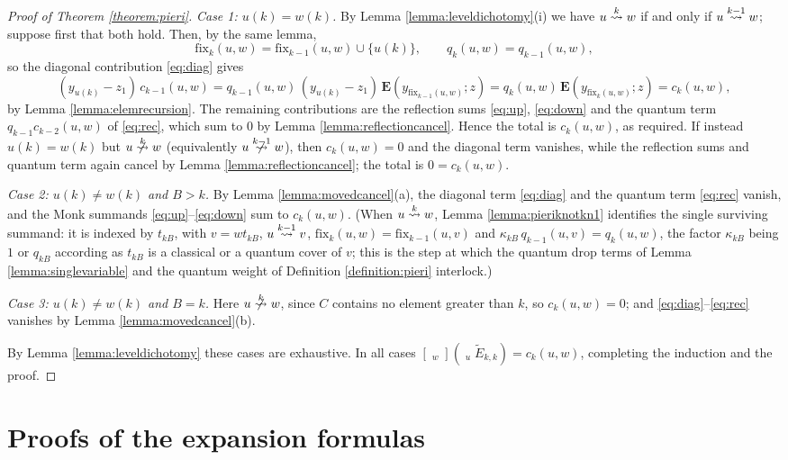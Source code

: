 \documentclass{amsart}
\theoremstyle{definition}
\theoremstyle{remark}
\numberwithin{equation}{section}
\DeclareMathOperator{\qsch}{\widetilde{\mathfrak{S}}}
\newcommand{\xrightsquigarrow}[2][]{%
	\mathrel{\mathop{\rightsquigarrow}\limits^{\scriptstyle #2}%
	\ifx\hfuzz#1\hfuzz\else_{\scriptstyle #1}\fi}%
}
\newcommand{\tom}[1]{\ensuremath{\xrightsquigarrow{#1}}}
\newcommand{\fx}{\mathrm{fix}}
\newcommand{\wte}{\mathbf{E}}
\newcommand{\qelem}{\widetilde{E}}
\begin{document}
\begin{proof}[Proof of Theorem \ref{theorem:pieri}]
\emph{Case 1: $u(k)=w(k)$.} By Lemma \ref{lemma:leveldichotomy}(i) we have $u\tom{k}w$ if and only if $u\tom{k-1}w$; suppose first that both hold. Then, by the same lemma,
$$\fx_{k}(u,w)=\fx_{{k-1}}(u,w)\cup\{u(k)\},\qquad q_k(u,w)=q_{k-1}(u,w),$$
so the diagonal contribution \eqref{eq:diag} gives
$$(y_{u(k)}-z_1)\,c_{k-1}(u,w)=q_{k-1}(u,w)\,(y_{u(k)}-z_1)\,\wte(y_{\fx_{{k-1}}(u,w)};z)=q_k(u,w)\,\wte(y_{\fx_{k}(u,w)};z)=c_k(u,w),$$
by Lemma \ref{lemma:elemrecursion}. The remaining contributions are the reflection sums \eqref{eq:up}, \eqref{eq:down} and the quantum term $q_{k-1}c_{k-2}(u,w)$ of \eqref{eq:rec}, which sum to $0$ by Lemma \ref{lemma:reflectioncancel}. Hence the total is $c_k(u,w)$, as required. If instead $u(k)=w(k)$ but $u\ntom{k}w$ (equivalently $u\ntom{k-1}w$), then $c_k(u,w)=0$ and the diagonal term vanishes, while the reflection sums and quantum term again cancel by Lemma \ref{lemma:reflectioncancel}; the total is $0=c_k(u,w)$.

\emph{Case 2: $u(k)\neq w(k)$ and $B>k$.} By Lemma \ref{lemma:movedcancel}(a), the diagonal term \eqref{eq:diag} and the quantum term \eqref{eq:rec} vanish, and the Monk summands \eqref{eq:up}--\eqref{eq:down} sum to $c_k(u,w)$. (When $u\tom{k}w$, Lemma \ref{lemma:pieriknotkn1} identifies the single surviving summand: it is indexed by $t_{kB}$, with $v=wt_{kB}$, $u\tom{k-1}v$, $\fx_k(u,w)=\fx_{k-1}(u,v)$ and $\kappa_{kB}\,q_{k-1}(u,v)=q_k(u,w)$, the factor $\kappa_{kB}$ being $1$ or $q_{kB}$ according as $t_{kB}$ is a classical or a quantum cover of $v$; this is the step at which the quantum drop terms of Lemma \ref{lemma:singlevariable} and the quantum weight of Definition \ref{definition:pieri} interlock.)

\emph{Case 3: $u(k)\neq w(k)$ and $B=k$.} Here $u\ntom{k}w$, since $C$ contains no element greater than $k$, so $c_k(u,w)=0$; and \eqref{eq:diag}--\eqref{eq:rec} vanishes by Lemma \ref{lemma:movedcancel}(b).

By Lemma \ref{lemma:leveldichotomy} these cases are exhaustive. In all cases $[\qsch_w](\qsch_u\qelem_{k,k})=c_k(u,w)$, completing the induction and the proof.
\end{proof}

\section{Proofs of the expansion formulas} \label{section:proofvside}
\end{document}
